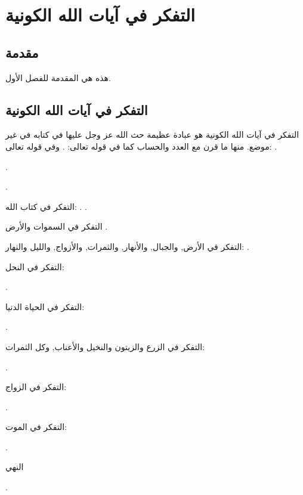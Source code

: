 
\chapter{التفكر في آيات الله الكونية}

\section{مقدمة}
هذه هي المقدمة للفصل الأول.

\section{التفكر في آيات الله الكونية}
التفكر في آيات الله الكونية هو عبادة عظيمة حث الله عز وجل عليها في كتابه في غير موضع. منها ما قرن مع العدد والحساب كما في قوله تعالى:
\quranayah*[17][12]{\footnotesize \surahname*[17]}.
وفي قوله تعالى: \quranayah*[10][5]{\footnotesize \surahname*[10]}.

\quranayah*[3][190-191]{\footnotesize \surahname*[3]}.

\quranayah*[45][3-5]{\footnotesize \surahname*[45]}.

التفكر في كتاب الله:
\quranayah*[59][21]{\footnotesize \surahname*[59]}.
\quranayah*[16][44]{\footnotesize \surahname*[16]}.

التفكر في السموات والأرض
\quranayah*[45][13]{\footnotesize \surahname*[45]}.

التفكر في الأرض, والجبال, والأنهار, والثمرات, والأزواج, والليل والنهار:
\quranayah*[13][3]{\footnotesize \surahname*[13]}.

التفكر في النحل:

\quranayah*[16][69]{\footnotesize \surahname*[16]}.

التفكر في الحياة الدنيا:

\quranayah*[10][24]{\footnotesize \surahname*[10]}.

التفكر في الزرع والزيتون والنخيل والأعناب, وكل الثمرات:

\quranayah*[16][11]{\footnotesize \surahname*[16]}.

التفكر في الزواج:

\quranayah*[30][21]{\footnotesize \surahname*[30]}.

التفكر في الموت:

\quranayah*[39][42]{\footnotesize \surahname*[39]}.

النهي

\quranayah*[22][46]{\footnotesize \surahname*[22]}.
